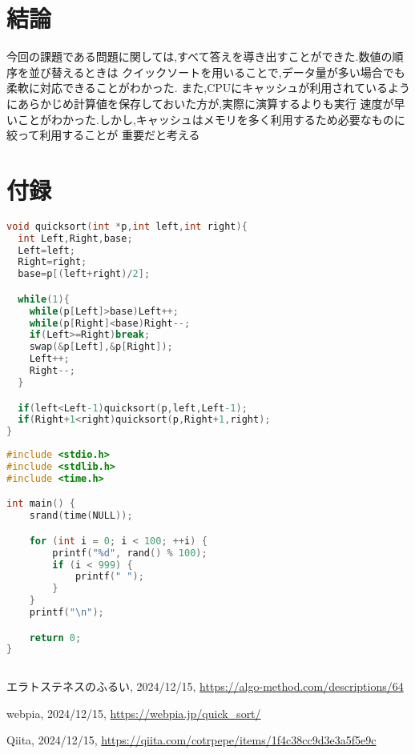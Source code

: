 \documentclass[a4j]{ltjsarticle}
\renewcommand{\lstlistingname}{ソースコード}
\begin{document}
  \renewcommand{\thelstlisting}{\arabic{lstlisting}}  %
  \setcounter{lstlisting}{0}  %
    
  \section{結論}
  今回の課題である問題に関しては,すべて答えを導き出すことができた.数値の順序を並び替えるときは
  クイックソートを用いることで,データ量が多い場合でも柔軟に対応できることがわかった.
  また,CPUにキャッシュが利用されているようにあらかじめ計算値を保存しておいた方が,実際に演算するよりも実行
  速度が早いことがわかった.しかし,キャッシュはメモリを多く利用するため必要なものに絞って利用することが
  重要だと考える

  \section*{付録}
  \renewcommand{\lstlistingname}{付録}
  \begin{lstlisting}[language=C,caption=quicksort関数]
void quicksort(int *p,int left,int right){
  int Left,Right,base;
  Left=left;
  Right=right;
  base=p[(left+right)/2];

  while(1){
    while(p[Left]>base)Left++;
    while(p[Right]<base)Right--;
    if(Left>=Right)break;
    swap(&p[Left],&p[Right]);
    Left++;
    Right--;
  }

  if(left<Left-1)quicksort(p,left,Left-1);
  if(Right+1<right)quicksort(p,Right+1,right);
}
  \end{lstlisting}

  \begin{lstlisting}[language=C,caption=乱数生成プログラム]
#include <stdio.h>
#include <stdlib.h>
#include <time.h>

int main() {
    srand(time(NULL));

    for (int i = 0; i < 100; ++i) {
        printf("%d", rand() % 100);
        if (i < 999) {
            printf(" ");
        }
    }
    printf("\n"); 

    return 0;
}
    
  \end{lstlisting}
  
  \begin{thebibliography}{99}

			エラトステネスのふるい,
			2024/12/15,
			\url{https://algo-method.com/descriptions/64}

			webpia,
			2024/12/15,
			\url{https://webpia.jp/quick_sort/}

			Qiita,
			2024/12/15,
			\url{https://qiita.com/cotrpepe/items/1f4c38cc9d3e3a5f5e9c}
			
		
			
	\end{thebibliography}
\end{document}
